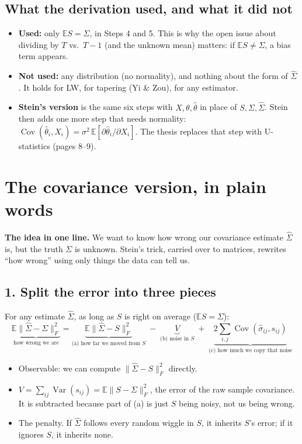 \documentclass[12pt]{article}
\begin{document}
\subsection*{What the derivation used, and what it did not}
\begin{itemize}
\item \textbf{Used:} only $\mathbb{E}S=\Sigma$, in Steps 4 and 5. This is why the open issue about dividing by $T$
vs.\ $T-1$ (and the unknown mean) matters: if $\mathbb{E}S\neq\Sigma$, a bias term appears.
\item \textbf{Not used:} any distribution (no normality), and nothing about the form of $\hat\Sigma$. It holds for
LW, for tapering (Yi \& Zou), for any estimator.
\item \textbf{Stein's version} is the same six steps with $X,\theta,\hat\theta$ in place of $S,\Sigma,\hat\Sigma$. Stein then
adds one more step that needs normality: $\operatorname{Cov}(\hat\theta_i,X_i)=\sigma^2\,\mathbb{E}[\partial\hat\theta_i/\partial X_i]$.
The thesis replaces that step with U-statistics (pages 8--9).
\end{itemize}

\newpage
\section*{The covariance version, in plain words}

\textbf{The idea in one line.} We want to know how wrong our covariance estimate $\hat\Sigma$ is, but the
truth $\Sigma$ is unknown. Stein's trick, carried over to matrices, rewrites ``how wrong'' using only
things the data can tell us.

\subsection*{1. Split the error into three pieces}
For any estimate $\hat\Sigma$, as long as $S$ is right on average ($\mathbb{E}S=\Sigma$):
\[
\underbrace{\mathbb{E}\|\hat\Sigma-\Sigma\|_F^2}_{\text{how wrong we are}}
=\underbrace{\mathbb{E}\|\hat\Sigma-S\|_F^2}_{\text{(a) how far we moved from }S}
\;-\;\underbrace{V}_{\text{(b) noise in }S}
\;+\;\underbrace{2\sum_{i,j}\operatorname{Cov}(\hat\sigma_{ij},s_{ij})}_{\text{(c) how much we copy that noise}}
\]
\begin{itemize}
\item[(a)] Observable: we can compute $\|\hat\Sigma-S\|_F^2$ directly.
\item[(b)] $V=\sum_{ij}\operatorname{Var}(s_{ij})=\mathbb{E}\|S-\Sigma\|_F^2$, the error of the raw sample
covariance. It is subtracted because part of (a) is just $S$ being noisy, not us being wrong.
\item[(c)] The penalty. If $\hat\Sigma$ follows every random wiggle in $S$, it inherits $S$'s error; if it
ignores $S$, it inherits none.
\end{itemize}
\end{document}
